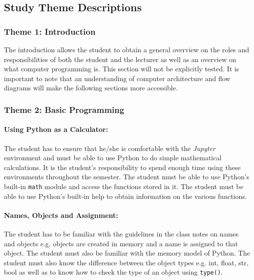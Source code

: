     \subsection{Study Theme Descriptions}
        \subsubsection{Theme 1: Introduction}
            The introduction allows the student to obtain a general overview on
            the roles and responsibilities of both the student and the lecturer
            as well as an overview on what computer programming is. This
            section will not be explicitly tested. It is important to note that
            an understanding of computer architecture and flow diagrams will
            make the following sections more accessible.

        \subsubsection{Theme 2: Basic Programming}
            \paragraph{Using Python as a Calculator:}
                The student has to ensure that he/she is comfortable with the
                \emph{Jupyter} environment and must be able to use Python to do
                simple mathematical calculations. It is the student's
                responsibility to spend enough time using these environments
                throughout the semester. The student must be able to use
                Python's built-in \texttt{math} module and access the functions
                stored in it. The student must be able to use Python's built-in
                help to obtain information on the various functions.

            \paragraph{Names, Objects and Assignment:}
                The student has to be familiar with the guidelines in the class
                notes on names and objects e.g. objects are created in memory
                and a name is assigned to that object. The student must also be
                familiar with the memory model of Python. The student must also
                know the difference between the object types e.g. int, float,
                str, bool as well as to know how to check the type of an object
                using \texttt{type()}.

